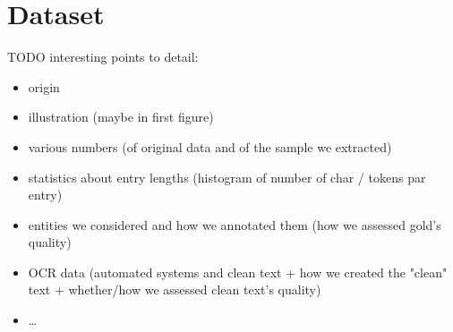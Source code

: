 \section{Dataset}

TODO interesting points to detail:
\begin{itemize}
    \item origin
    \item illustration (maybe in first figure)
    \item various numbers (of original data and of the sample we extracted)
    \item statistics about entry lengths (histogram of number of char / tokens par entry)
    \item entities we considered and how we annotated them (how we assessed gold's quality)
    \item OCR data (automated systems and clean text + how we created the "clean" text + whether/how we assessed clean text's quality)
    \item \dots
\end{itemize}
